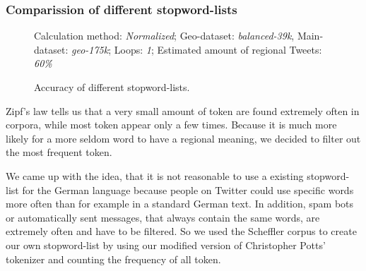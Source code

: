 \documentclass[../Main.tex]{subfiles}
\begin{document}
\subsubsection{Comparission of different stopword-lists}
\begin{figure}
\begin{center}
\end{center}
  \label{geo_graph1}
Calculation method: \textit{Normalized}; Geo-dataset: \textit{balanced-39k}, Main-dataset: \textit{geo-175k}; Loops: \textit{1}; Estimated amount of regional Tweets: \textit{60\%}
  \caption{Accuracy of different stopword-lists.}

\end{figure}

Zipf's law tells us that a very small amount of token are found extremely often in corpora, while most token appear only a few times. Because it is much more likely for a more seldom word to have a regional meaning, we decided to filter out the most frequent token. 

We came up with the idea, that it is not reasonable to use a existing stopword-list for the German language because people on Twitter could use specific words more often than for example in a standard German text. In addition, spam bots or automatically sent messages, that always contain the same words, are extremely often and  have to be filtered. So we used the Scheffler corpus to create our own stopword-list by using our modified version of Christopher Potts' tokenizer and counting the frequency of all token.
\end{document}

